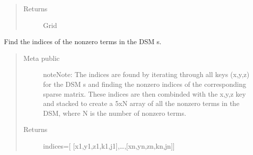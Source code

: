 \documentclass[letterpaper,10pt,english]{sphinxmanual}
\begin{document}
\begin{fulllineitems}
\begin{fulllineitems}
\begin{quote}
\begin{description}
\item[{Returns}] \leavevmode
Grid

\end{description}\end{quote}

\end{fulllineitems}


\begin{fulllineitems}
\label{\detokenize{index:DictionarySparseMatrix.DS.xyznonzero}}
Find the indices of the nonzero terms in the DSM s.
\begin{quote}\begin{description}
\item[{Meta public}] \leavevmode
\begin{sphinxadmonition}{note}{Note:}
The indices are found by iterating through all           keys (x,y,z) for the DSM s and finding the nonzero           indices of the corresponding sparse matrix.           These indices are then combinded           with the x,y,z key and stacked to create a 5xN           array of all the nonzero terms in the DSM,           where N is the number of nonzero           terms.
\end{sphinxadmonition}

\item[{Returns}] \leavevmode
indices={[} {[}x1,y1,z1,k1,j1{]},…,{[}xn,yn,zn,kn,jn{]}{]}

\end{description}\end{quote}

\end{fulllineitems}


\end{fulllineitems}

\end{document}
